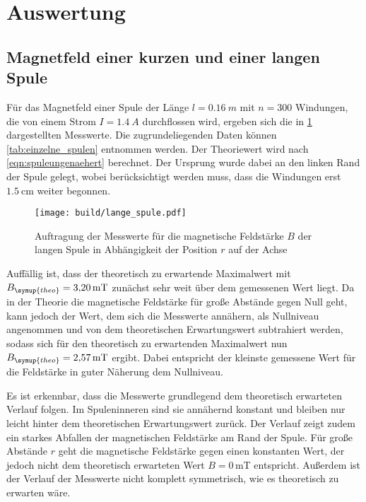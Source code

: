 \section{Auswertung}
\label{sec:Auswertung}

\subsection{Magnetfeld einer kurzen und einer langen Spule}

Für das Magnetfeld einer Spule der Länge $l=\SI{0,16}{m}$ mit $n=300$ Windungen,
die von einem Strom $I=\SI{1,4}{A}$ durchflossen wird, ergeben sich die in
\ref{fig:lange_spule} dargestellten Messwerte. Die zugrundeliegenden Daten können
\ref{tab:einzelne_spulen} entnommen werden. Der Theoriewert wird nach \ref{eqn:spuleungenaehert} berechnet.
Der Ursprung wurde dabei an den linken Rand der Spule gelegt, wobei berücksichtigt werden
muss, dass die Windungen erst $\SI{1,5}{\centi\metre}$ weiter begonnen.

\begin{figure}
  \centering
  \texttt{[image: build/lange\_spule.pdf]}
  \caption{Auftragung der Messwerte für die magnetische Feldstärke $B$ der langen Spule
  in Abhängigkeit der Position $r$ auf der Achse}
  \label{fig:lange_spule}
\end{figure}

Auffällig ist, dass der theoretisch zu erwartende Maximalwert mit $B_{\symup{theo}}=\SI{3,20}{\milli\tesla}$
zunächst sehr weit über dem gemessenen Wert liegt. Da in der Theorie die magnetische
Feldstärke für große Abstände gegen Null geht, kann jedoch der Wert, dem sich die
Messwerte annähern, als Nullniveau angenommen und von dem theoretischen Erwartungswert
subtrahiert werden, sodass sich für den theoretisch zu erwartenden Maximalwert nun
$B_{\symup{theo}}=\SI{2,57}{\milli\tesla}$ ergibt. Dabei entspricht der kleinste gemessene Wert für die Feldstärke
in guter Näherung dem Nullniveau.

Es ist erkennbar, dass die Messwerte grundlegend dem theoretisch erwarteten Verlauf folgen.
Im Spuleninneren sind sie annähernd konstant und bleiben nur leicht hinter dem
theoretischen Erwartungswert zurück. Der Verlauf zeigt zudem ein starkes Abfallen
der magnetischen Feldstärke am Rand der Spule. Für große Abstände $r$ geht die magnetische
Feldstärke gegen einen konstanten Wert, der jedoch nicht dem theoretisch erwarteten
Wert $B=0$\,mT entspricht. Außerdem ist der Verlauf der Messwerte nicht komplett symmetrisch,
wie es theoretisch zu erwarten wäre.


